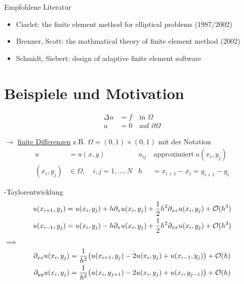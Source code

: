 
Empfohlene Literatur
\begin{itemize}
	\item Ciarlet: the finite element method for elliptical problems (1987/2002)\\
	\item Brenner, Scott: the mathmatical theory of finite element method (2002)\\
	\item Schmidt, Siebert: design of adaptive finite element software
\end{itemize}



\section{Beispiele und Motivation}

\begin{align*}
	\Delta u &= f \quad  \text{in }  \Omega\\
		   u &= 0 \quad \text{auf } \partial\Omega
\end{align*}

$\rightarrow$ \underline{finite Differenzen}\enter
\enter
z.B. $\Omega = (0,1) \times (0,1)$ mit der Notation
\begin{align*}
	 u&= u(x,y)				 &   u_{ij}&\ \text{approximiert}\ u(x_i,y_j)\\
	(x_i, y_j) &\in \Omega, \quad i,j = 1,\dots,N&  h&= x_{i+1} - x_i = y_{i+1}-y_i
\end{align*}

-Taylorentwicklung
\begin{align*}
	u(x_{i+1},y_j) &= 	u(x_{i},y_j) + 	h\partial_x u(x_{i},y_j) + \frac{1}{2}h^2 \partial_{xx}	u(x_i,y_j) + \mathcal{O}(h^3)\\
	u(x_{i-1},y_j) &= 	u(x_{i},y_j) - 	h\partial_x u(x_{i},y_j) + \frac{1}{2}h^2 \partial_{xx}	u(x_i,y_j) + \mathcal{O}(h^3)\\
\end{align*}

$\implies$
\begin{align*}
	\partial_{xx} u(x_i,y_j) &= \frac{1}{h^2}\big(	u(x_{i+1},y_j) - 2u(x_i,y_j) + 	u(x_{i-1},y_j) \big) + \mathcal{O}(h)\\
	\partial_{yy} u(x_i,y_j) &= \frac{1}{h^2}\big(	u(x_i,y_{j+1}) - 2u(x_i,y_j) + 	u(x_i,y_{j-1}) \big) + \mathcal{O}(h)
\end{align*}

